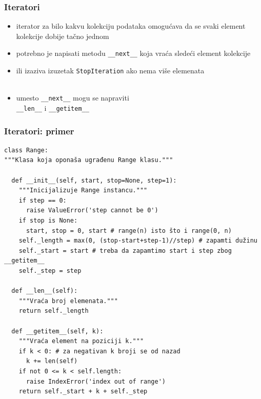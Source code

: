 \documentclass[compress,aspectratio=169]{beamer}
\begin{document}
\begin{frame}[fragile]
  \frametitle{Iteratori}
  \begin{itemize}
    \item iterator za bilo kakvu kolekciju podataka omogućava da se svaki element kolekcije dobije tačno jednom
    \item potrebno je napisati metodu \texttt{\_\_next\_\_} koja vraća sledeći element kolekcije 
    \item ili izaziva izuzetak \texttt{StopIteration} ako nema više elemenata \\ \ \\
    \item umesto \texttt{\_\_next\_\_} mogu se napraviti \\ \texttt{\_\_len\_\_} i \texttt{\_\_getitem\_\_}
  \end{itemize}
\end{frame}

\begin{frame}[fragile,shrink=15]
  \frametitle{Iteratori: primer}
\begin{verbatim}
class Range:
"""Klasa koja oponaša ugrađenu Range klasu."""

  def __init__(self, start, stop=None, step=1):
    """Inicijalizuje Range instancu."""
    if step == 0:
      raise ValueError('step cannot be 0')
    if stop is None:
      start, stop = 0, start # range(n) isto što i range(0, n)
    self._length = max(0, (stop-start+step-1)//step) # zapamti dužinu
    self._start = start # treba da zapamtimo start i step zbog __getitem__
    self._step = step

  def __len__(self):
    """Vraća broj elemenata."""
    return self._length

  def __getitem__(self, k):
    """Vraća element na poziciji k."""
    if k < 0: # za negativan k broji se od nazad
      k += len(self)
    if not 0 <= k < self.length:
      raise IndexError('index out of range')
    return self._start + k + self._step
\end{verbatim}
\end{frame}
\end{document}
